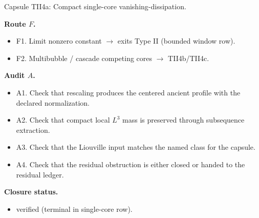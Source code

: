 \documentclass[11pt]{amsart}
\newcommand{\capsulefield}[1]{\par\smallskip\noindent\textbf{#1.}\ }
\begin{document}
\begin{proofcapsule}{Capsule TII4a: Compact single-core vanishing-dissipation.}
  \capsulefield{Route \(F\)}
  \begin{itemize}[leftmargin=1.8em]
  \item F1. Limit nonzero constant $\to$ exits Type II (bounded window row).
  \item F2. Multibubble / cascade competing cores $\to$ TII4b/TII4c.
  \end{itemize}

  \capsulefield{Audit \(A\)}
  \begin{itemize}[leftmargin=1.8em]
  \item A1. Check that rescaling produces the centered ancient profile with the declared normalization.
  \item A2. Check that compact local $L^3$ mass is preserved through subsequence extraction.
  \item A3. Check that the Liouville input matches the named class for the capsule.
  \item A4. Check that the residual obstruction is either closed or handed to the residual ledger.
  \end{itemize}
  \capsulefield{Closure status}
  \begin{itemize}[leftmargin=1.8em]
  \item verified (terminal in single-core row).
  \end{itemize}
\end{proofcapsule}
\end{document}
